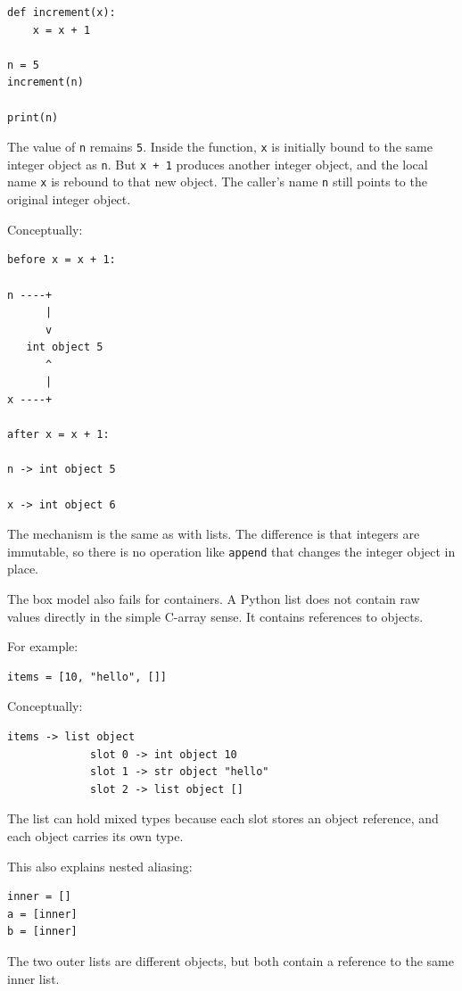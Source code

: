 \begin{verbatim}
def increment(x):
    x = x + 1

n = 5
increment(n)

print(n)
\end{verbatim}

The value of \texttt{n} remains \texttt{5}. Inside the function, \texttt{x} is initially bound to the same integer object as \texttt{n}. But \texttt{x + 1} produces another integer object, and the local name \texttt{x} is rebound to that new object. The caller's name \texttt{n} still points to the original integer object.

Conceptually:

\begin{verbatim}
before x = x + 1:

n ----+
      |
      v
   int object 5
      ^
      |
x ----+

after x = x + 1:

n -> int object 5

x -> int object 6
\end{verbatim}

The mechanism is the same as with lists. The difference is that integers are immutable, so there is no operation like \texttt{append} that changes the integer object in place.

The box model also fails for containers. A Python list does not contain raw values directly in the simple C-array sense. It contains references to objects.

For example:

\begin{verbatim}
items = [10, "hello", []]
\end{verbatim}

Conceptually:

\begin{verbatim}
items -> list object
             slot 0 -> int object 10
             slot 1 -> str object "hello"
             slot 2 -> list object []
\end{verbatim}

The list can hold mixed types because each slot stores an object reference, and each object carries its own type.

This also explains nested aliasing:

\begin{verbatim}
inner = []
a = [inner]
b = [inner]
\end{verbatim}

The two outer lists are different objects, but both contain a reference to the same inner list.

